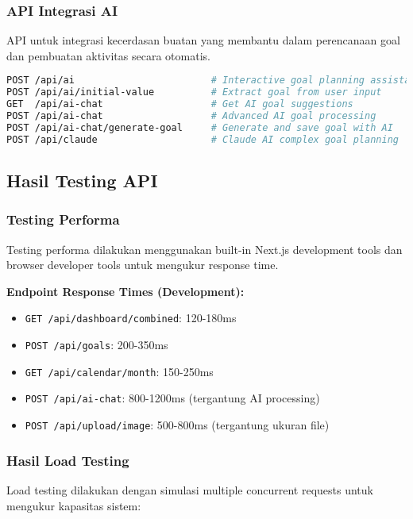 \subsubsection{API Integrasi AI}

API untuk integrasi kecerdasan buatan yang membantu dalam perencanaan goal dan pembuatan aktivitas secara otomatis.

\begin{lstlisting}[language=bash, caption=AI API Endpoints]
POST /api/ai                        # Interactive goal planning assistant
POST /api/ai/initial-value          # Extract goal from user input
GET  /api/ai-chat                   # Get AI goal suggestions
POST /api/ai-chat                   # Advanced AI goal processing
POST /api/ai-chat/generate-goal     # Generate and save goal with AI
POST /api/claude                    # Claude AI complex goal planning
\end{lstlisting}

\subsection{Hasil Testing API}

\subsubsection{Testing Performa}

Testing performa dilakukan menggunakan built-in Next.js development tools dan browser developer tools untuk mengukur response time.

\textbf{Endpoint Response Times (Development):}
\begin{itemize}
\item \texttt{GET /api/dashboard/combined}: 120-180ms
\item \texttt{POST /api/goals}: 200-350ms
\item \texttt{GET /api/calendar/month}: 150-250ms
\item \texttt{POST /api/ai-chat}: 800-1200ms (tergantung AI processing)
\item \texttt{POST /api/upload/image}: 500-800ms (tergantung ukuran file)
\end{itemize}

\subsubsection{Hasil Load Testing}

Load testing dilakukan dengan simulasi multiple concurrent requests untuk mengukur kapasitas sistem:

